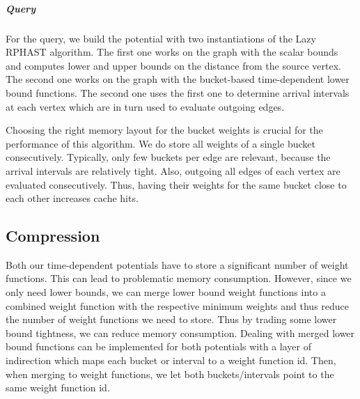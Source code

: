 \documentclass[a4paper,UKenglish,cleveref, autoref, thm-restate]{lipics-v2021}
\begin{document}

\subparagraph{Query}
For the query, we build the potential with two instantiations of the Lazy RPHAST algorithm.
The first one works on the graph with the scalar bounds and computes lower and upper bounds on the distance from the source vertex.
The second one works on the graph with the bucket-based time-dependent lower bound functions.
The second one uses the first one to determine arrival intervals at each vertex which are in turn used to evaluate outgoing edges.

Choosing the right memory layout for the bucket weights is crucial for the performance of this algorithm.
We do store all weights of a single bucket consecutively.
Typically, only few buckets per edge are relevant, because the arrival intervals are relatively tight.
Also, outgoing all edges of each vertex are evaluated consecutively.
Thus, having their weights for the same bucket close to each other increases cache hits.


\subsection{Compression}

Both our time-dependent potentials have to store a significant number of weight functions.
This can lead to problematic memory consumption.
However, since we only need lower bounds, we can merge lower bound weight functions into a combined weight function with the respective minimum weights and thus reduce the number of weight functions we need to store.
Thus by trading some lower bound tightness, we can reduce memory consumption.
Dealing with merged lower bound functions can be implemented for both potentials with a layer of indirection which maps each bucket or interval to a weight function id.
Then, when merging to weight functions, we let both buckets/intervals point to the same weight function id.
\end{document}
